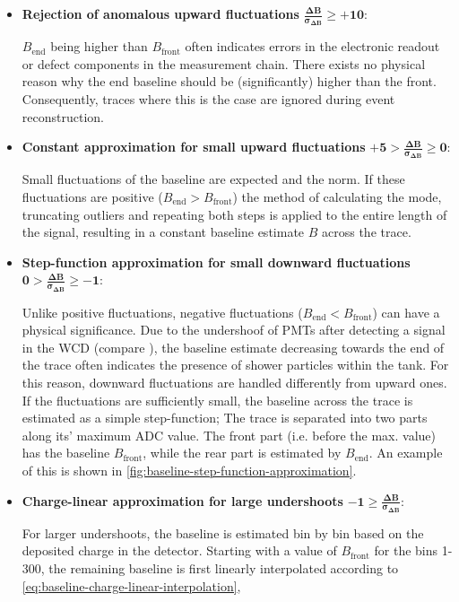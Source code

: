 \begin{itemize}
	\item \textbf{Rejection of anomalous upward fluctuations} $\mathbf{\frac{\Delta B}{\sigma_{\Delta B}} \geq +10}$:

	$B_\text{end}$ being higher than $B_\text{front}$ often indicates errors in the electronic readout or defect components in the measurement chain. There 
	exists no physical reason why the end baseline should be (significantly) higher than the front. Consequently, traces where this is the case are ignored 
	during event reconstruction.

	\item \textbf{Constant approximation for small upward fluctuations} $\mathbf{+5 > \frac{\Delta B}{\sigma_{\Delta B}} \geq 0}$:

	Small fluctuations of the baseline are expected and the norm. If these fluctuations are positive ($B_\text{end} > B_\text{front}$) the method of 
	calculating the mode, truncating outliers and repeating both steps is applied to the entire length of the signal, resulting in a constant baseline estimate
	$B$ across the trace.

	\item \textbf{Step-function approximation for small downward fluctuations} $\mathbf{0 > \frac{\Delta B}{\sigma_{\Delta B}} \geq -1}$:

	Unlike positive fluctuations, negative fluctuations ($B_\text{end} < B_\text{front}$) can have a physical significance. Due to the undershoof of PMTs after
	detecting a signal in the WCD (compare \cite{glietta2008recovery}), the baseline estimate decreasing towards the end of the trace often indicates the 
	presence of shower particles within the tank. For this reason, downward fluctuations are handled differently from upward ones. If the fluctuations are 
	sufficiently small, the baseline across the trace is estimated as a simple step-function; The trace is separated into two parts along its' maximum ADC 
	value. The front part (i.e. before the max. value) has the baseline $B_\text{front}$, while the rear part is estimated by $B_\text{end}$. An example of 
	this is shown in \autoref{fig:baseline-step-function-approximation}.

	\item \textbf{Charge-linear approximation for large undershoots} $\mathbf{-1 \geq \frac{\Delta B}{\sigma_{\Delta B}}}$:

	For larger undershoots, the baseline is estimated bin by bin based on the deposited charge in the detector. Starting with a value of $B_\text{front}$ for 
	the bins 1-300, the remaining baseline is first linearly interpolated according to \autoref{eq:baseline-charge-linear-interpolation},


\end{itemize}
